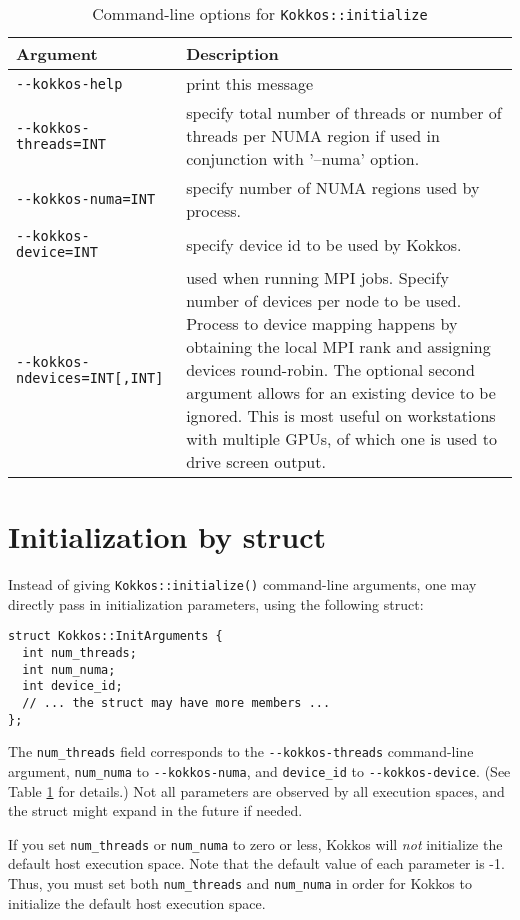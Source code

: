 \begin{table}
\caption{Command-line options for \lstinline|Kokkos::initialize|}
\label{TBL:CommandLineOptions}
\begin{small}
\begin{tabular}[t]{lp{}}
\hline
Argument & Description \\\hline
\lstinline|--kokkos-help| & print this message \\
\lstinline|--kokkos-threads=INT| & 
specify total number of threads or number of threads per NUMA region if used in conjunction with '--numa' option. \\
\lstinline|--kokkos-numa=INT| & specify number of NUMA regions used by process. \\
\lstinline|--kokkos-device=INT| & specify device id to be used by Kokkos. \\
\lstinline|--kokkos-ndevices=INT[,INT]| & used when running MPI jobs. Specify number of
devices per node to be used. Process to device
mapping happens by obtaining the local MPI rank
and assigning devices round-robin. The optional
second argument allows for an existing device
to be ignored. This is most useful on workstations
with multiple GPUs, of which one is used to drive
screen output.\\
\hline
\end{tabular}
\end{small}
\end{table}

\section{Initialization by struct}\label{S:init:struct}

Instead of giving \lstinline|Kokkos::initialize()| command-line arguments,
one may directly pass in initialization parameters, using the following struct:
\begin{lstlisting}
struct Kokkos::InitArguments {
  int num_threads;
  int num_numa;
  int device_id;
  // ... the struct may have more members ...
};
\end{lstlisting}
The \lstinline|num_threads| field corresponds to the \verb!--kokkos-threads! command-line argument,
\lstinline|num_numa| to \verb!--kokkos-numa!, and \lstinline|device_id| to \verb!--kokkos-device!.
(See Table \ref{TBL:CommandLineOptions} for details.)
Not all parameters are observed by all execution spaces, and the struct might expand in the future if needed.

If you set \lstinline|num_threads| or \lstinline|num_numa| to zero or less, 
Kokkos will \emph{not} initialize the default host execution space.
Note that the default value of each parameter is -1.
Thus, you must set both \lstinline|num_threads| and \lstinline|num_numa|
in order for Kokkos to initialize the default host execution space.

